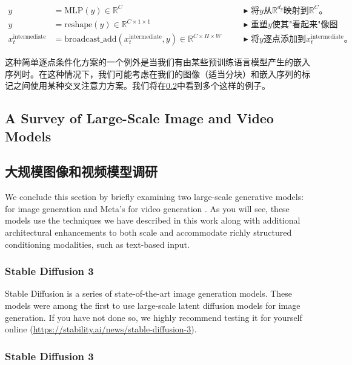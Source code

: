 \begin{align*}
    y &= \text{MLP}(y) \in \mathbb{R}^C\quad 
    && \blacktriangleright\,\,\text{将$y$从$\mathbb{R}^{d_y}$映射到$\mathbb{R}^C$。}\\
    y &= \text{reshape}(y) \in \mathbb{R}^{C \times 1 \times 1}\quad 
    && \blacktriangleright\,\,\text{重塑$y$使其"看起来"像图像。}\\
    x^{\text{intermediate}}_t &= \text{broadcast\_add}(x^{\text{intermediate}}_t,y) \in \mathbb{R}^{C \times H \times W}\quad && \blacktriangleright\,\,\text{将$y$逐点添加到$x^{\text{intermediate}}_t$。}
\end{align*}

这种简单逐点条件化方案的一个例外是当我们有由某些预训练语言模型产生的嵌入序列时。在这种情况下，我们可能考虑在我们的图像（适当分块）和嵌入序列的标记之间使用某种交叉注意力方案。我们将在\cref{sec:large_scale_models}中看到多个这样的例子。

\subsection{A Survey of Large-Scale Image and Video Models}

\subsection{大规模图像和视频模型调研}
\label{sec:large_scale_models}
We conclude this section by briefly examining two large-scale generative models:  for image generation and Meta's  for video generation \citep{sd3, moviegen}. As you will see, these models use the techniques we have described in this work along with additional architectural enhancements to both scale and accommodate richly structured conditioning modalities, such as text-based input.

\subsubsection{Stable Diffusion 3}

Stable Diffusion is a series of state-of-the-art image generation models. These models were among the first to use large-scale latent diffusion models for image generation. If you have not done so, we highly recommend testing it for yourself online (\url{https://stability.ai/news/stable-diffusion-3}).\\

\subsubsection{Stable Diffusion 3}

